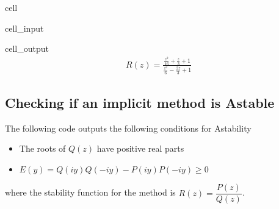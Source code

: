 \documentclass[letterpaper,10pt,english]{jupyterBook}
\begin{document}
\begin{sphinxuseclass}{cell}
\begin{sphinxVerbatimInput}
\begin{sphinxuseclass}{cell_input}
\end{sphinxuseclass}\end{sphinxVerbatimInput}
\begin{sphinxVerbatimOutput}

\begin{sphinxuseclass}{cell_output}\begin{equation*}
\begin{split}\displaystyle R(z) = \frac{\frac{z^{2}}{16} + \frac{z}{3} + 1}{\frac{z^{2}}{6} - \frac{2 z}{3} + 1}\end{split}
\end{equation*}
\end{sphinxuseclass}\end{sphinxVerbatimOutput}

\end{sphinxuseclass}

\subsection{Checking if an implicit method is A\sphinxhyphen{}stable}
\label{\detokenize{8_Appendices/8.1_Python:checking-if-an-implicit-method-is-a-stable}}
\sphinxAtStartPar
The following code outputs the following conditions for A\sphinxhyphen{}stability
\begin{itemize}
\item {} 
\sphinxAtStartPar
The roots of \(Q(z)\) have positive real parts

\item {} 
\sphinxAtStartPar
\(E(y) = Q(iy)Q(-iy) - P(iy)P(-iy) \geq 0\)

\end{itemize}

\sphinxAtStartPar
where the stability function for the method is \(R(z) = \dfrac{P(z)}{Q(z)}\).
\end{document}
